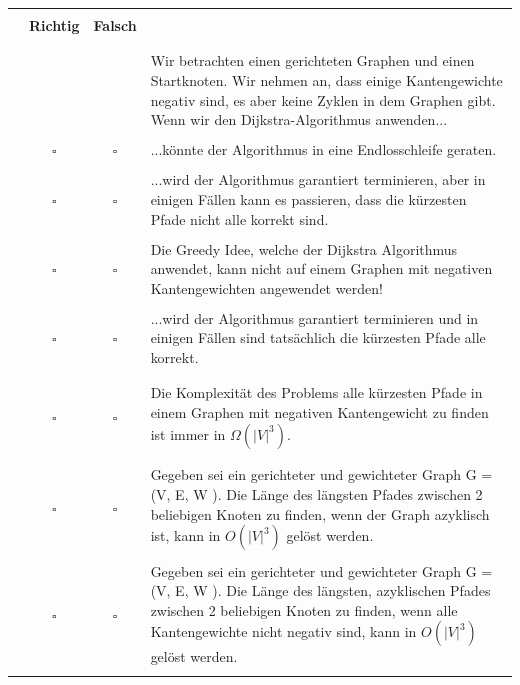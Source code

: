 \documentclass{article}
\begin{document}
\begin{table}[]
    \centering
    \begin{tabular}{ | p{1cm} | c c | p{13cm} |} \hline
    & & & \\
     & \textbf{Richtig} & \textbf{Falsch} &  \\ & & & \\ \hline \hline  & & & \\
         & & &  Wir betrachten einen gerichteten Graphen und einen Startknoten. Wir nehmen an, dass einige Kantengewichte negativ sind, es aber keine Zyklen in dem Graphen gibt. Wenn wir den Dijkstra-Algorithmus anwenden... \\ & & & \\
     \cite{probeklausur24}\cite{probeklausur21} & $\square$ &  $\square$  & ...könnte der Algorithmus in eine Endlosschleife geraten. \\ & & & \\
     \cite{probeklausur24}& $\square$ &  $\square$  & ...wird der Algorithmus garantiert terminieren, aber in einigen Fällen kann es passieren, dass die kürzesten Pfade nicht alle korrekt sind. \\ & & & \\
     \cite{probeklausur21} & $\square$ &  $\square$  & Die Greedy Idee, welche der Dijkstra Algorithmus anwendet, kann nicht auf einem Graphen mit negativen Kantengewichten angewendet werden! \\ & & & \\
     \cite{probeklausur24} \cite{probeklausur21} & $\square$ &  $\square$  & ...wird der Algorithmus garantiert terminieren und in einigen Fällen sind tatsächlich die kürzesten Pfade alle korrekt.\\ & & & \\ \hline \hline & & & \\
     \cite{hauptklausur21} & $\square$ &  $\square$  & Die Komplexität des Problems alle kürzesten Pfade in einem Graphen mit negativen Kantengewicht zu finden ist immer in $\Omega(|V|^3)$. \\ & & & \\ \hline \hline & & & \\ 
     \cite{hauptklausur21} & $\square$ &  $\square$  &  Gegeben sei ein gerichteter und gewichteter Graph G = (V, E, W ). Die Länge des längsten Pfades zwischen 2 beliebigen Knoten zu finden, wenn der Graph azyklisch ist, kann in $O(|V|^3)$ gelöst werden. \\ & & & \\
     \cite{hauptklausur21}  & $\square$ &  $\square$  &  Gegeben sei ein gerichteter und gewichteter Graph G = (V, E, W ). Die Länge des längsten, azyklischen Pfades zwischen 2 beliebigen Knoten zu finden, wenn alle Kantengewichte nicht negativ sind, kann in $O(|V|^3)$ gelöst werden. \\ & & & \\

\end{tabular}
\end{table}
\end{document}
